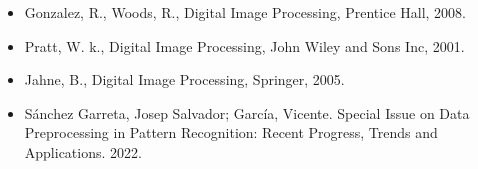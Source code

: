 \begin{itemize}
    \item Gonzalez, R., Woods, R., Digital Image Processing, Prentice Hall, 2008.
    \item Pratt, W. k., Digital Image Processing, John Wiley and Sons Inc, 2001.
    \item Jahne, B., Digital Image Processing, Springer, 2005.
    \item Sánchez Garreta, Josep Salvador; García, Vicente. Special Issue on Data Preprocessing in Pattern Recognition: Recent Progress, Trends and Applications. 2022.
\end{itemize}